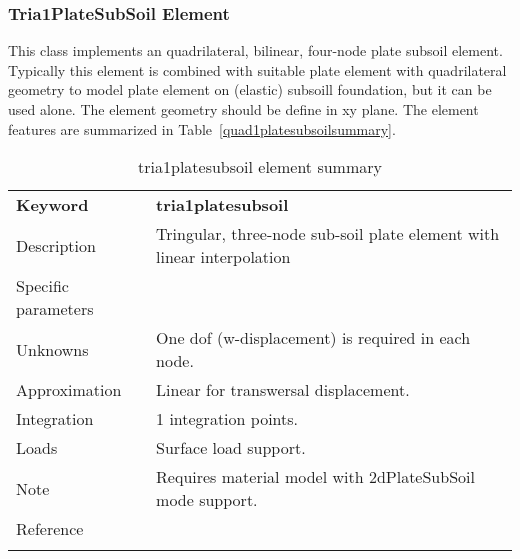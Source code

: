 \documentclass[a4paper]{article}
\newcommand{\templabel}{}%
\newcommand{\tempcaption}{}%
\newcounter{nelpar}
\newenvironment{elementsummary}[5]{%
  \gdef\tempcaption{#4}%
  \gdef\templabel{#5}%
  \setcounter{nelpar}{0}%
  \begin{center} %
    \begin{table}[!htb] %
      \begin{tabular}{|l|p{9cm}|}\hline %
        {\bf Keyword} & \bf{#1}\\ %
        {Description} & {#2}\\ %
        {Specific parameters} & {#3}\\ \hline %
}{
  \\ \hline %
      \end{tabular}%
      \caption{\tempcaption}%
      \label{\templabel}%
    \end{table}%
  \end{center}%
}
\newcommand{\elementDescription}[2]{{#1} & {#2}\\ }
\begin{document}
\subsubsection{Tria1PlateSubSoil Element} \label{tria1platesubsoil}
This class implements an quadrilateral, bilinear, four-node plate subsoil element.
Typically this element is combined with suitable plate element with quadrilateral geometry to model plate element on 
(elastic) subsoill foundation, but it can be used alone. The element geometry should be define in xy plane.
The element features are summarized in Table~\ref{quad1platesubsoilsummary}.

\begin{elementsummary}{tria1platesubsoil}{Tringular, three-node sub-soil plate element with linear interpolation}{}{tria1platesubsoil element summary}{tria1platesubsoilsummary}
\elementDescription{Unknowns}{One dof (w-displacement) is required in each node.}
\elementDescription{Approximation}{Linear for transwersal displacement.}
\elementDescription{Integration}{1 integration points.}
\elementDescription{Loads}{Surface load support.}
\elementDescription{Note}{Requires material model with 2dPlateSubSoil mode support.}
\elementDescription{Reference}{\cite{BittnarSejnoha1996}}
\end{elementsummary}


\clearpage
\end{document}
